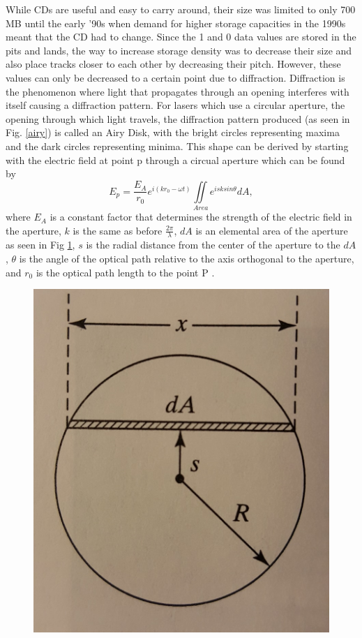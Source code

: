 \documentclass[ notitlepage, numerical, 11pt]{revtex4-1} %
\begin{document}
While CDs are useful and easy to carry around, their size was limited to only 700 MB until the early '90s when demand for higher storage capacities in the 1990s meant that the CD had to change. Since the 1 and 0 data values are stored in the pits and lands, the way to increase storage density was to decrease their size and also place tracks closer to each other by decreasing their pitch. However, these values can only be decreased to a certain point due to diffraction. Diffraction is the phenomenon where light that propagates through an opening interferes with itself causing a diffraction pattern. For lasers which use a circular aperture, the opening through which light travels, the diffraction pattern produced (as seen in Fig. \ref{airy}) is called an Airy Disk, with the bright circles representing maxima and the dark circles representing minima. This shape can be derived by starting with the electric field at point p through a circual aperture which can be found by 
\begin{equation}
E_p = \frac{E_A}{r_0}e^{i(k r_0 -\omega t)}\iint \limits_{Area} e^{i s k sin\theta} dA,
\label{EP}
\end{equation}
where $E_A$ is a constant factor that determines the strength of the electric field in the aperture, $k$ is the same as before $\frac{2\pi}{\lambda}$, $dA$ is an elemental area of the aperture as seen in Fig \ref{aperture}, $s$ is the radial distance from the center of the aperture to the $dA$, $\theta$ is the angle of the optical path relative to the axis orthogonal to the aperture, and $r_0$ is the optical path length to the point P \cite{optics}. 
\begin{figure}[H]
\centerline{\includegraphics[scale=.45]{bessel.jpg}}
\caption{\cite {optics.}}
\label{aperture}
\end{figure} 
\end{document}
